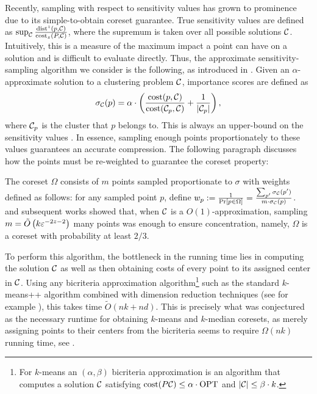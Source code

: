 Recently, sampling with respect to sensitivity values has grown to prominence due to its simple-to-obtain coreset guarantee.  True sensitivity values are defined
as $\sup_{\mathcal C} \frac{\operatorname{dist}^z(p, \mathcal C)}{\operatorname{cost}_z(P, \mathcal C)}$, where the supremum is taken over all possible solutions $\mathcal C$. Intuitively, this is a measure
of the maximum impact a point can have on a solution and is difficult to evaluate directly.
Thus, the approximate sensitivity-sampling algorithm we consider is the following, as introduced in \cite{FL11}.
Given an $\alpha$-approximate solution to a clustering problem $\mathcal C$, importance scores are defined as
\begin{equation}
\label{eq:sensitivity}
\sigma_\mathcal C(p) = \alpha \cdot \left( \dfrac{\operatorname{cost}(p, \mathcal C)}{\operatorname{cost}(\mathcal C_{p}, \mathcal C)} + \dfrac{1}{|\mathcal C_p|} \right),
\end{equation}
where $\mathcal C_p$ is the cluster that $p$ belongs to. This is always an upper-bound on the sensitivity values \cite{FL11}. In essence, sampling enough points
proportionately to these values guarantees an accurate compression. The following paragraph discusses how the points must be re-weighted to guarantee the
coreset property:

The coreset $\Omega$ consists of $m$ points sampled proportionate to $\sigma$ with weights defined as follows: for any sampled point $p$, define
$w_p := \frac{1}{\Pr[p \in \Omega]} = \frac{\sum_{p'} \sigma_\mathcal C(p')}{m \cdot \sigma_\mathcal C(p)}$. 
\cite{HuangV20} and subsequent works showed that, when $\mathcal C$ is a $O(1)$-approximation, sampling $m = \tilde O\left(
k \varepsilon^{-2z-2}\right)$ many points was enough to ensure concentration, namely, $\Omega$ is a coreset with probability at least $2/3$.

To perform this algorithm, the bottleneck in the running time lies in computing the solution $\mathcal C$ as well as then obtaining costs of every point to its
assigned center in $\mathcal C$. Using any bicriteria approximation algorithm\footnote{For $k$-means an $(\alpha,\beta)$ bicriteria approximation is an algorithm
that computes a solution $\mathcal C$ satisfying $\operatorname{cost}(P\mathcal C)\leq \alpha\cdot \text{OPT}$ and $|\mathcal C|\leq \beta\cdot k$.} such as the standard $k$-means++ algorithm
\cite{ArV07} combined with dimension reduction techniques (see for example \cite{BecchettiBC0S19,CohenEMMP15,MakarychevMR19}), this takes time $\tilde O(nk
+nd)$. This is precisely what was conjectured as the necessary runtime for obtaining $k$-means and $k$-median coresets, as merely assigning points to their
centers from the bicriteria seems to require $\Omega(nk)$ running time, see \cite{DSWY22}. 

